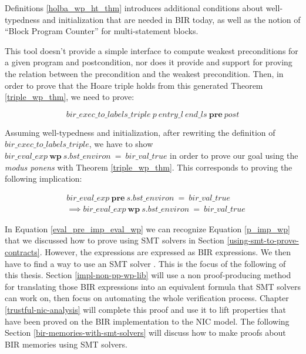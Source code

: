 \documentclass{kththesis}
\begin{document}
{Definitions \ref{holba_wp_ht_thm} introduces additional conditions about well-typedness and initialization that are needed in BIR today\footnotemark, as well as the notion of ``Block Program Counter'' for multi-statement blocks. %


This tool doesn't provide a simple interface to compute weakest preconditions for a given program and postcondition, nor does it provide and support for proving the relation between the precondition and the weakest precondition. Then, in order to prove that the Hoare triple holds from this generated Theorem \ref{triple_wp_thm}, we need to prove:

\begin{equation}
    bir\_exec\_to\_labels\_triple~p~entry\_l~end\_ls~\mathbf{pre}~post
    \label{triple_pre_thm}
\end{equation}

Assuming well-typedness and initialization, after rewriting the definition of $bir\_exec\_to\_labels\_triple$, we have to show $bir\_eval\_exp~\mathbf{wp}~s.bst\_environ~=~bir\_val\_true$ in order to prove our goal using the \textit{modus ponens} with Theorem \ref{triple_wp_thm}. This corresponds to proving the following implication:

\begin{small}
    \begin{equation}
        \begin{split}
            &bir\_eval\_exp~\mathbf{pre}~s.bst\_environ~=~bir\_val\_true\\
            &\implies bir\_eval\_exp~\mathbf{wp}~s.bst\_environ~=~bir\_val\_true
        \end{split}
        \label{eval_pre_imp_eval_wp}
    \end{equation}
\end{small}

In Equation \ref{eval_pre_imp_eval_wp} we can recognize Equation \ref{p_imp_wp} that we discussed how to prove using \gls{SMT} solvers in Section \ref{using-smt-to-prove-contracts}. However, the expressions are expressed as BIR expressions. We then have to find a way to use an SMT solver \footnotemark. This is the focus of the following of this thesis. Section \ref{impl-non-pp-wp-lib} will use a non \gls{proof-producing} method for translating those BIR expressions into an equivalent formula that SMT solvers can work on, then focus on automating the whole verification process. Chapter \ref{trustful-nic-analysis} will complete this proof and use it to lift properties that have been proved on the BIR implementation to the \gls{NIC} model. The following Section \ref{bir-memories-with-smt-solvers} will discuss how to make proofs about BIR memories using \gls{SMT} solvers.

}
\end{document}
